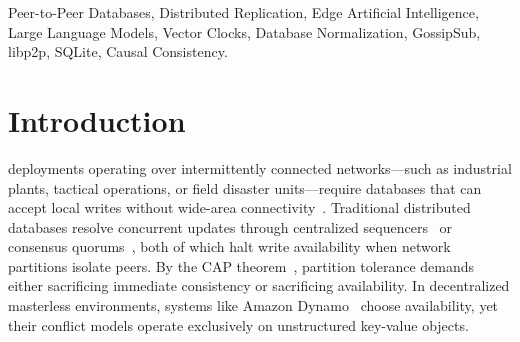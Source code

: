 \begin{IEEEkeywords}
Peer-to-Peer Databases, Distributed Replication, Edge Artificial Intelligence, Large Language Models, Vector Clocks, Database Normalization, GossipSub, libp2p, SQLite, Causal Consistency.
\end{IEEEkeywords}

\section{Introduction}
\label{sec:introduction}

 deployments operating over intermittently connected networks---such as industrial plants, tactical operations, or field disaster units---require databases that can accept local writes without wide-area connectivity~\cite{satyanarayanan2017emergence}. Traditional distributed databases resolve concurrent updates through centralized sequencers~\cite{brewer2012cap} or consensus quorums~\cite{corbett2013spanner, ongaro2014raft}, both of which halt write availability when network partitions isolate peers. By the CAP theorem~\cite{gilbert2002brewer}, partition tolerance demands either sacrificing immediate consistency or sacrificing availability. In decentralized masterless environments, systems like Amazon Dynamo~\cite{decandia2007dynamo} choose availability, yet their conflict models operate exclusively on unstructured key-value objects.

